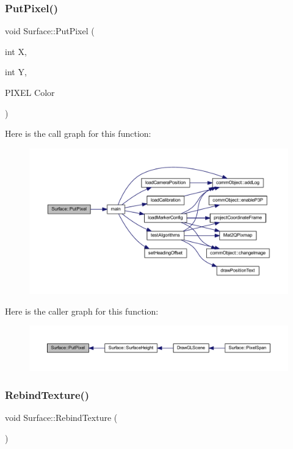 \subsubsection{\texorpdfstring{Put\+Pixel()}{PutPixel()}}
{\footnotesize\ttfamily void Surface\+::\+Put\+Pixel (\begin{DoxyParamCaption}\item[{int}]{X,  }\item[{int}]{Y,  }\item[{P\+I\+X\+EL}]{Color }\end{DoxyParamCaption})}

Here is the call graph for this function\+:
\nopagebreak
\begin{figure}[H]
\begin{center}
\leavevmode
\includegraphics[width=350pt]{class_surface_a728571d0386e9690ce1760931562c72b_cgraph}
\end{center}
\end{figure}
Here is the caller graph for this function\+:
\nopagebreak
\begin{figure}[H]
\begin{center}
\leavevmode
\includegraphics[width=350pt]{class_surface_a728571d0386e9690ce1760931562c72b_icgraph}
\end{center}
\end{figure}
\mbox{\label{class_surface_aa75c49f53fec5c49ba8422c0d64815e6}} 
\subsubsection{\texorpdfstring{Rebind\+Texture()}{RebindTexture()}}
{\footnotesize\ttfamily void Surface\+::\+Rebind\+Texture (\begin{DoxyParamCaption}{ }\end{DoxyParamCaption})}


